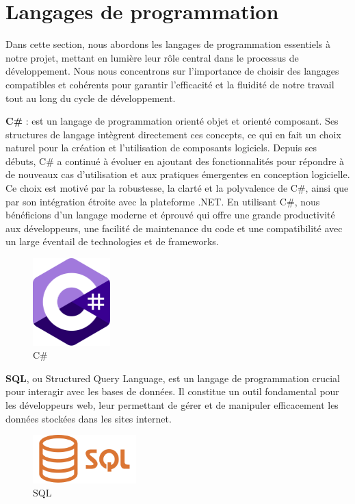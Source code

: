 \section{Langages de programmation}

\hspace{\parindent}Dans cette section, nous abordons les langages de programmation essentiels à notre projet, mettant en lumière leur rôle central dans le processus de développement. Nous nous concentrons sur l'importance de choisir des langages compatibles et cohérents pour garantir l'efficacité et la fluidité de notre travail tout au long du cycle de développement.

\textbf{C\#} : est un langage de programmation orienté objet et orienté composant. Ses structures de langage intègrent directement ces concepts, ce qui en fait un choix naturel pour la création et l'utilisation de composants logiciels. Depuis ses débuts, C\# a continué à évoluer en ajoutant des fonctionnalités pour répondre à de nouveaux cas d'utilisation et aux pratiques émergentes en conception logicielle. Ce choix est motivé par la robustesse, la clarté et la polyvalence de C\#, ainsi que par son intégration étroite avec la plateforme .NET. En utilisant C\#, nous bénéficions d'un langage moderne et éprouvé qui offre une grande productivité aux développeurs, une facilité de maintenance du code et une compatibilité avec un large éventail de technologies et de frameworks.
\\
\begin{figure}[H]
    \centering
    \includegraphics[width=3cm]{Figures/csharp.png}
    \caption{C\#}
\end{figure}


\textbf{SQL}, ou Structured Query Language, est un langage de programmation crucial pour interagir avec les bases de données. Il constitue un outil fondamental pour les développeurs web, leur permettant de gérer et de manipuler efficacement les données stockées dans les sites internet.
\\
\begin{figure}[H]
    \centering
    \includegraphics[width=4cm]{Figures/sql.png}
    \caption{SQL}
\end{figure}



